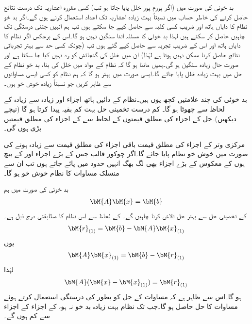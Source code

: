 بد خوئی کی صورت میں (اگر پورم پور خلل پایا جاتا ہو تب) کسی مقررہ اعشاریہ تک درست نتائج حاصل کرنے کی خاطر حساب میں نسبتاً بہت زیادہ اعشاریہ تک اعداد استعمال کرنے ہوں گے۔اگر بد خو نظام کا دایاں ہاتھ اور   ضریب  کسی کلیہ سے حاصل کیے جا سکتے ہوں تب ہم انہیں جتنی درستگی تک  چاہیں حاصل کر سکتے ہیں لہٰذا بد خوئی کا مسئلہ اتنا سنگین نہیں ہو گا۔اس کے برعکس اگر نظام کا دایاں ہاتھ اور اس کے  ضریب  تجربہ سے حاصل کیے گئے ہوں تب (چونکہ کسی حد سے بہتر تجرباتی نتائج حاصل کرنا ممکن نہیں ہوتا ہے لہٰذا)   ان میں خلل کی گنجائش کو رد نہیں کیا جا سکتا ہے  اور صورت حال زیادہ سنگین ہو گی۔ہمیں ماننا  ہو گا کہ نظام کے مواد میں خلل کی بنا، بد خو نظام کے حل میں بہت زیادہ خلل پایا جائے گا۔ایسی صورت میں بہتر ہو گا کہ ہم نظام کو کسی ایسی مساواتوں سے ظاہر کریں جو نسبتاً زیادہ خوش خو ہوں۔

بد خوئی کی چند علامتیں کچھ یوں ہیں۔نظام کے دائیں ہاتھ اجزاء اور زیادہ سے زیادہ  کے لحاظ سے  چھوٹا ہو گا۔ کم درست تخمینی حل بہت کم  بقیہ پیدا کرتا ہو گا (نیچے دیکھیں)۔حل کے اجزاء کی مطلق قیمتوں کے لحاظ سے  کے اجزاء کی مطلق قیمتیں بڑی ہوں گی۔ 

مرکزی وتر کے اجزاء کی مطلق قیمت باقی اجزاء کی مطلق قیمت سے زیادہ ہونے کی صورت میں خوش خو نظام پایا جائے گا۔اگر چوکور قالب جس کے بڑے اجزاء  اور  کے بیچ ہوں کے معکوس کے بڑے اجزاء بھی لگ بھگ انہیں حدود میں پائے جاتے ہوں تب ان سے منسلک مساوات کا نظام خوش خو ہو گا۔ 

بد خوئی کی صورت میں ہم
\begin{align}\label{مساوات_خطی_اعدادی_نظام_بقیہ_الف}
\bM{A}\bM{x}=\bM{b}
\end{align}
کے تخمینی حل  سے  بہتر حل تلاش کرنا چاہیں گے۔  کے لحاظ سے اس نظام کا مطابقتی  درج ذیل ہے۔ 
\begin{align*}
\bM{r}_{(1)}=\bM{b}-\bM{A}\bM{x}_{(1)}
\end{align*}
یوں 
\begin{align*}
\bM{A}\bM{x}_{(1)}=\bM{b}-\bM{r}_{(1)}
\end{align*}
لہٰذا
\begin{align}\label{مساوات_خطی_اعدادی_نظام_بقیہ_ب}
\bM{A}(\bM{x}-\bM{x}_{(1)})=\bM{r}_{(1)}
\end{align}
ہو گا۔اس سے ظاہر ہے کہ مساوات  کے حل کو بطور   کی درستگی استعمال کرتے ہوئے مساوات  کا حل حاصل ہو گا۔جب تک نظام بہت زیادہ بد خو نہ ہو،  کے اجزاء  کے اجزاء سے کم ہوں گے۔

